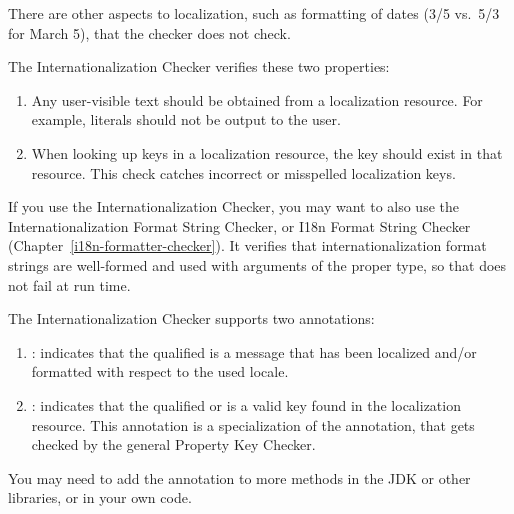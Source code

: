 There are other aspects to localization, such as formatting of dates (3/5
vs.~5/3 for March 5), that the checker does not check.

The Internationalization Checker verifies these two properties:

\begin{enumerate}

\item
  Any user-visible text should be obtained from a localization resource.
  For example,  literals should not be output to the user.

\item
  When looking up keys in a localization resource, the key should exist in
  that resource.  This check catches incorrect or misspelled localization
  keys.

\end{enumerate}

If you use the Internationalization Checker, you may want to also use the
Internationalization Format String Checker, or I18n Format String Checker
(Chapter~\ref{i18n-formatter-checker}).
It verifies that internationalization format strings are well-formed and
used with arguments of the proper type, so that
does not fail at run time.


The Internationalization Checker supports two annotations:

\begin{enumerate}
\item {}: indicates that the qualified
 is a message that has been localized and/or formatted with
respect to the used locale.

\item {}: indicates that the
qualified  or  is a valid key found in the
localization resource.
This annotation is a specialization of the  annotation, that
gets checked by the general Property Key Checker.
\end{enumerate}

You may need to add the  annotation to more methods in the
JDK or other libraries, or in your own code.




